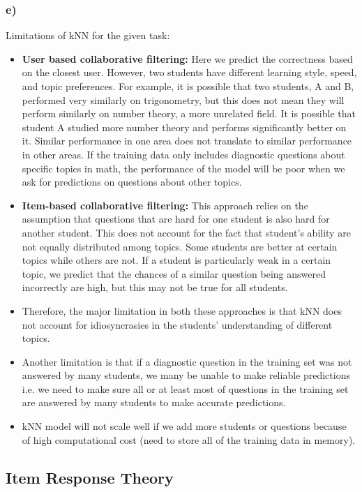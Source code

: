 \documentclass{article}
\begin{document}
\subsubsection*{e)}
Limitations of kNN for the given task:
\begin{itemize}
  
  \item \textbf{User based collaborative filtering:} Here we predict the correctness based on the closest user. However, two students have different learning style, speed, and topic preferences. For example, it is possible that  two students, A and B, performed very similarly on trigonometry, but this does not mean they will perform similarly on number theory, a more unrelated field. It is possible that student A studied more number theory and performs significantly better on it. Similar performance in one area does not translate to similar performance in other areas. If the training data only includes diagnostic questions about specific topics in math, the performance of the model will be poor when we ask for predictions on questions about other topics.
  \item \textbf{Item-based collaborative filtering:} This approach relies on the assumption that questions that are hard for one student is also hard for another student. This does not account for the fact that student's ability are not equally distributed among topics. Some students are better at certain topics while others are not. If a student is particularly weak in a certain topic, we predict that the chances of a similar question being answered incorrectly are high, but this may not be true for all students. 
  \item Therefore, the major limitation in both these approaches is that kNN does not account for idiosyncrasies in the students' understanding of different topics. 
  \item Another limitation is that if a diagnostic question in the training set was not answered by many students, we many be unable to make reliable predictions i.e. we need to make sure all or at least most of questions in the training set are answered by many students to make accurate predictions.
  \item kNN model will not scale well if we add more students or questions because of high computational cost (need to store all of the training data in memory). 
\end{itemize}



\subsection*{Item Response Theory}
\end{document}
